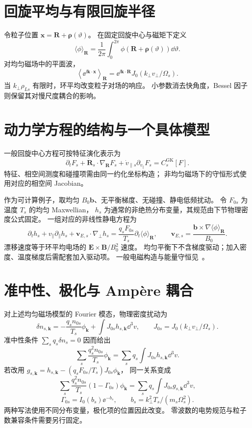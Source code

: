 \section{回旋平均与有限回旋半径}
令粒子位置 $\bm x=\bm R+\bm\rho(\vartheta)$。
在固定回旋中心与磁矩下定义
\[
\langle\phi\rangle_{\bm R}
=\frac1{2\pi}\int_0^{2\pi}
\phi(\bm R+\bm\rho(\vartheta))\dd\vartheta.
\]
对均匀磁场中的平面波，
\[
\left\langle\ee^{\ii\bm k\cdot\bm x}\right\rangle_{\bm R}
=\ee^{\ii\bm k\cdot\bm R}
J_0(k_\perp v_\perp/\Omega_s).
\]
当 $k_\perp\rho_{Ls}$ 有限时，环平均改变粒子对场的响应。
小参数消去快角度，Bessel 因子则保留其对慢尺度耦合的影响。

\section{动力学方程的结构与一个具体模型}
一般回旋中心方程可按特征演化表示为
\[
\partial_tF_s+\dot{\bm R}_s\cdot\nabla_{\bm R}F_s
+\dot v_{\parallel s}\partial_{v_\parallel}F_s=C_s^{\mathrm{GK}}[F].
\]
特征、相空间测度和碰撞项需由同一约化坐标构造；
非均匀磁场下的守恒形式使用对应的相空间 Jacobian。

作为可计算例子，取均匀 $B_0\bm b$、无平衡梯度、无碰撞、静电低频扰动。
令 $F_{0s}$ 为温度 $T_s$ 的均匀 Maxwellian，
$h_s$ 为通常的非绝热分布变量，其规范由下节物理密度公式固定。
一组对应的非线性静电方程为
\begin{equation}\label{eq:slab-gk}
\partial_th_s+v_\parallel\partial_\parallel h_s
+\bm v_{E,s}\cdot\nabla_\perp h_s
=\frac{q_sF_{0s}}{T_s}\partial_t\langle\phi\rangle_{\bm R},
\qquad
\bm v_{E,s}=\frac{\bm b\times\nabla\langle\phi\rangle_{\bm R}}{B_0}.
\end{equation}
漂移速度等于环平均电场的 $\bm E\times\bm B/B_0^2$ 速度。
均匀平衡下不含梯度驱动；加入密度、温度梯度后需配套加入驱动项。
一般电磁构造与能量守恒见~\cite{brizard2007,abel2013}。

\section{准中性、极化与 Amp\`ere 耦合}
对上述均匀磁场模型的 Fourier 模态，物理密度扰动为
\[
\delta n_{s,\bm k}
=-\frac{q_sn_{0s}}{T_s}\phi_{\bm k}
+\int J_{0s}h_{s,\bm k}\dd^3v,\qquad
J_{0s}=J_0(k_\perp v_\perp/\Omega_s).
\]
准中性条件 $\sum_sq_s\delta n_s=0$ 因而给出
\begin{equation}\label{eq:gk-qn}
\sum_s\frac{q_s^2n_{0s}}{T_s}\phi_{\bm k}
=\sum_sq_s\int J_{0s}h_{s,\bm k}\dd^3v.
\end{equation}
若改用 $g_{s,\bm k}=h_{s,\bm k}-(q_sF_{0s}/T_s)J_{0s}\phi_{\bm k}$，
同一关系变成
\[
\sum_s\frac{q_s^2n_{0s}}{T_s}(1-\Gamma_{0s})\phi_{\bm k}
=\sum_sq_s\int J_{0s}g_{s,\bm k}\dd^3v,
\]
\[
\Gamma_{0s}=I_0(b_s)\ee^{-b_s},\qquad
b_s=k_\perp^2T_s/(m_s\Omega_s^2).
\]
两种写法使用不同分布变量，极化项的位置因此改变。
零波数的电势规范与粒子数兼容条件需要另行固定。

